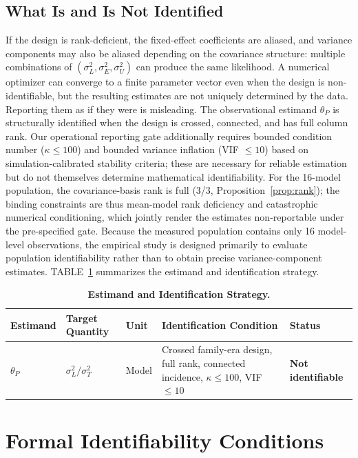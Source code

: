 \documentclass{ieeeaccess}
\theoremstyle{definition}
\theoremstyle{plain}
\begin{document}
\subsection{What Is and Is Not Identified}
If the design is rank-deficient, the fixed-effect coefficients are aliased, and variance components may also be aliased depending on the covariance structure: multiple combinations of $(\sigma^2_L, \sigma^2_E, \sigma^2_U)$ can produce the same likelihood. A numerical optimizer can converge to a finite parameter vector even when the design is non-identifiable, but the resulting estimates are not uniquely determined by the data. Reporting them as if they were is misleading. The observational estimand $\theta_P$ is structurally identified when the design is crossed, connected, and has full column rank. Our operational reporting gate additionally requires bounded condition number ($\kappa \leq 100$) and bounded variance inflation (VIF $\leq 10$) based on simulation-calibrated stability criteria; these are necessary for reliable estimation but do not themselves determine mathematical identifiability. For the 16-model population, the covariance-basis rank is full (3/3, Proposition~\ref{prop:rank}); the binding constraints are thus mean-model rank deficiency and catastrophic numerical conditioning, which jointly render the estimates non-reportable under the pre-specified gate. Because the measured population contains only 16 model-level observations, the empirical study is designed primarily to evaluate population identifiability rather than to obtain precise variance-component estimates. TABLE~\ref{tab:estimands} summarizes the estimand and identification strategy.

\begin{table}[!htbp]
\caption{\textbf{Estimand and Identification Strategy.}}
\label{tab:estimands}
\centering
\footnotesize
\begin{tabular}{p{65pt}p{80pt}p{50pt}p{160pt}p{80pt}}
\hline
\textbf{Estimand} & \textbf{Target Quantity} & \textbf{Unit} & \textbf{Identification Condition} & \textbf{Status} \\
\hline
$\theta_P$ & $\sigma^2_L / \sigma^2_T$ & Model & Crossed family-era design, full rank, connected incidence, $\kappa \leq 100$, VIF $\leq 10$ & \textbf{Not identifiable} \\
\hline
\end{tabular}
\end{table}

\section{Formal Identifiability Conditions}
\label{sec:ident}
\end{document}
